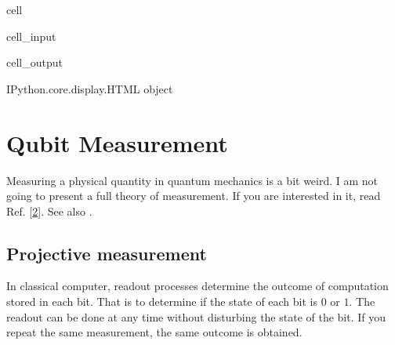 \documentclass[letterpaper,10pt,english]{jupyterBook}
\begin{document}
\begin{sphinxuseclass}{cell}\begin{sphinxVerbatimInput}

\begin{sphinxuseclass}{cell_input}
\begin{sphinxVerbatim}[commandchars=\\\{\}]
\end{sphinxVerbatim}

\end{sphinxuseclass}\end{sphinxVerbatimInput}
\begin{sphinxVerbatimOutput}

\begin{sphinxuseclass}{cell_output}
\begin{sphinxVerbatim}[commandchars=\\\{\}]
\PYGZlt{}IPython.core.display.HTML object\PYGZgt{}
\end{sphinxVerbatim}

\end{sphinxuseclass}\end{sphinxVerbatimOutput}

\end{sphinxuseclass}
\sphinxstepscope


\section{Qubit Measurement}
\label{\detokenize{qubit/measurement:qubit-measurement}}\label{\detokenize{qubit/measurement:sec-qubit-measurement}}\label{\detokenize{qubit/measurement::doc}}
\sphinxAtStartPar
Measuring a physical quantity in quantum mechanics is a bit weird.  I am not going to present a full theory of measurement. If you are interested in it, read Ref. {[}\hyperlink{cite.references:id4}{2}{]}. See also .


\subsection{Projective measurement}
\label{\detokenize{qubit/measurement:projective-measurement}}
\sphinxAtStartPar
In classical computer, readout processes determine the outcome of computation stored in each bit.  That is to determine if the state of each bit is \(0\) or \(1\). The readout can be done at any time without disturbing the state of the bit.  If you repeat the same measurement, the same outcome is obtained.
\end{document}

